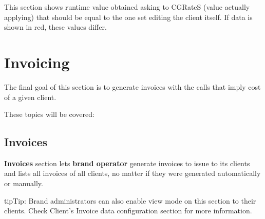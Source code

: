 \documentclass[letterpaper,10pt,english]{sphinxmanual}
\begin{document}
This section shows runtime value obtained asking to CGRateS (value actually applying) that should be equal to the one
set editing the client itself. If data is shown in red, these values differ.


\section{Invoicing}
\label{administration_portal/brand/invoicing/index::doc}\label{administration_portal/brand/invoicing/index:invoicing}
The final goal of this section is to generate invoices with the calls that imply
cost of a given client.

These topics will be covered:


\subsection{Invoices}
\label{administration_portal/brand/invoicing/invoices:invoices}\label{administration_portal/brand/invoicing/invoices::doc}
\textbf{Invoices} section lets \textbf{brand operator} generate invoices to issue to its clients and lists all invoices of all
clients, no matter if they were generated automatically or manually.

\begin{notice}{tip}{Tip:}
Brand administrators can also enable view mode on this section to their clients. Check Client's Invoice data
configuration section for more information.
\end{notice}
\end{document}
